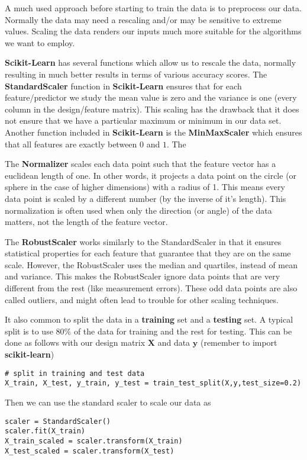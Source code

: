 \documentclass[%
oneside,                 %
final,                   %
10pt]{article}
\newenvironment{doconceexercise}{}{}
\newcounter{doconceexercisecounter}
\begin{document}
\begin{doconceexercise}



A much used approach before starting to train the data is  to preprocess our
data. Normally the data may need a rescaling and/or may be sensitive
to extreme values. Scaling the data renders our inputs much more
suitable for the algorithms we want to employ.

\textbf{Scikit-Learn} has several functions which allow us to rescale the
data, normally resulting in much better results in terms of various
accuracy scores.  The \textbf{StandardScaler} function in \textbf{Scikit-Learn}
ensures that for each feature/predictor we study the mean value is
zero and the variance is one (every column in the design/feature
matrix).  This scaling has the drawback that it does not ensure that
we have a particular maximum or minimum in our data set. Another
function included in \textbf{Scikit-Learn} is the \textbf{MinMaxScaler} which
ensures that all features are exactly between $0$ and $1$. The


The \textbf{Normalizer} scales each data
point such that the feature vector has a euclidean length of one. In other words, it
projects a data point on the circle (or sphere in the case of higher dimensions) with a
radius of 1. This means every data point is scaled by a different number (by the
inverse of it’s length).
This normalization is often used when only the direction (or angle) of the data matters,
not the length of the feature vector.

The \textbf{RobustScaler} works similarly to the StandardScaler in that it
ensures statistical properties for each feature that guarantee that
they are on the same scale. However, the RobustScaler uses the median
and quartiles, instead of mean and variance. This makes the
RobustScaler ignore data points that are very different from the rest
(like measurement errors). These odd data points are also called
outliers, and might often lead to trouble for other scaling
techniques.


It also common to split the data in a \textbf{training} set and a \textbf{testing} set. A typical split is to use $80\%$ of the data for training and the rest
for testing. This can be done as follows with our design matrix $\bm{X}$ and data $\bm{y}$ (remember to import \textbf{scikit-learn})
\begin{verbatim}
# split in training and test data
X_train, X_test, y_train, y_test = train_test_split(X,y,test_size=0.2)
\end{verbatim}
Then we can use the standard scaler to scale our data as
\begin{verbatim}
scaler = StandardScaler()
scaler.fit(X_train)
X_train_scaled = scaler.transform(X_train)
X_test_scaled = scaler.transform(X_test)
\end{verbatim}



\end{doconceexercise}
\end{document}
